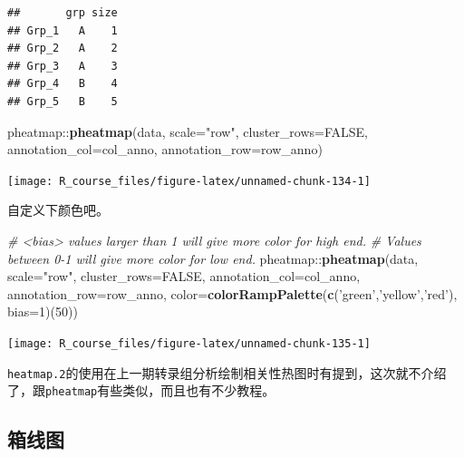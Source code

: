 \documentclass[]{article}
\newenvironment{Shaded}{\begin{snugshade}}{\end{snugshade}}
\newcommand{\KeywordTok}[1]{\textcolor[rgb]{0.13,0.29,0.53}{\textbf{{#1}}}}
\newcommand{\DataTypeTok}[1]{\textcolor[rgb]{0.13,0.29,0.53}{{#1}}}
\newcommand{\DecValTok}[1]{\textcolor[rgb]{0.00,0.00,0.81}{{#1}}}
\newcommand{\StringTok}[1]{\textcolor[rgb]{0.31,0.60,0.02}{{#1}}}
\newcommand{\CommentTok}[1]{\textcolor[rgb]{0.56,0.35,0.01}{\textit{{#1}}}}
\newcommand{\OtherTok}[1]{\textcolor[rgb]{0.56,0.35,0.01}{{#1}}}
\newcommand{\NormalTok}[1]{{#1}}
\numberwithin{figure}{section}
\numberwithin{table}{section}
\theoremstyle{definition}
\theoremstyle{definition}
\theoremstyle{definition}
\theoremstyle{remark}
\begin{document}
\begin{verbatim}
##       grp size
## Grp_1   A    1
## Grp_2   A    2
## Grp_3   A    3
## Grp_4   B    4
## Grp_5   B    5
\end{verbatim}

\begin{Shaded}
\begin{Highlighting}[]
\NormalTok{pheatmap::}\KeywordTok{pheatmap}\NormalTok{(data, }\DataTypeTok{scale=}\StringTok{"row"}\NormalTok{, }
\DataTypeTok{cluster_rows=}\OtherTok{FALSE}\NormalTok{, }\DataTypeTok{annotation_col=}\NormalTok{col_anno, }\DataTypeTok{annotation_row=}\NormalTok{row_anno)}
\end{Highlighting}
\end{Shaded}

\begin{center}\texttt{[image: R\_course\_files/figure-latex/unnamed-chunk-134-1]} \end{center}

自定义下颜色吧。

\begin{Shaded}
\begin{Highlighting}[]
\CommentTok{# <bias> values larger than 1 will give more color for high end. }
\CommentTok{# Values between 0-1 will give more color for low end.}
\NormalTok{pheatmap::}\KeywordTok{pheatmap}\NormalTok{(data, }\DataTypeTok{scale=}\StringTok{"row"}\NormalTok{, }\DataTypeTok{cluster_rows=}\OtherTok{FALSE}\NormalTok{, }
\DataTypeTok{annotation_col=}\NormalTok{col_anno, }\DataTypeTok{annotation_row=}\NormalTok{row_anno,}
\DataTypeTok{color=}\KeywordTok{colorRampPalette}\NormalTok{(}\KeywordTok{c}\NormalTok{(}\StringTok{'green'}\NormalTok{,}\StringTok{'yellow'}\NormalTok{,}\StringTok{'red'}\NormalTok{), }\DataTypeTok{bias=}\DecValTok{1}\NormalTok{)(}\DecValTok{50}\NormalTok{))}
\end{Highlighting}
\end{Shaded}

\begin{center}\texttt{[image: R\_course\_files/figure-latex/unnamed-chunk-135-1]} \end{center}

\texttt{heatmap.2}的使用在上一期转录组分析绘制相关性热图时有提到，这次就不介绍了，跟\texttt{pheatmap}有些类似，而且也有不少教程。

\subsection{箱线图}
\end{document}
